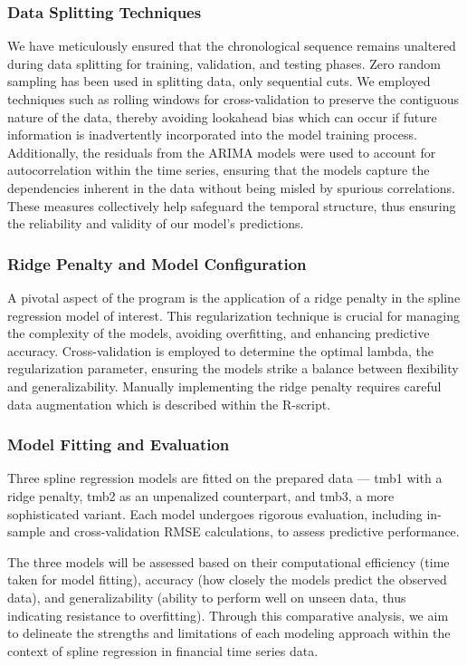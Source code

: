 \documentclass[12pt, twoside,hidelinks]{article}
\theoremstyle{definition}
\numberwithin{equation}{section}
\begin{document}
\subsubsection*{Data Splitting Techniques}
We have meticulously ensured that the chronological sequence remains unaltered during data splitting for training, validation, and testing phases. Zero random sampling has been used in splitting data, only sequential cuts. We employed techniques such as rolling windows for cross-validation to preserve the contiguous nature of the data, thereby avoiding lookahead bias which can occur if future information is inadvertently incorporated into the model training process. Additionally, the residuals from the ARIMA models were used to account for autocorrelation within the time series, ensuring that the models capture the dependencies inherent in the data without being misled by spurious correlations. These measures collectively help safeguard the temporal structure, thus ensuring the reliability and validity of our model's predictions.

\subsubsection*{Ridge Penalty and Model Configuration}
A pivotal aspect of the program is the application of a ridge penalty in the spline regression model of interest. This regularization technique is crucial for managing the complexity of the models, avoiding overfitting, and enhancing predictive accuracy. Cross-validation is employed to determine the optimal lambda, the regularization parameter, ensuring the models strike a balance between flexibility and generalizability. Manually implementing the ridge penalty requires careful data augmentation which is described within the R-script. 

\subsubsection*{Model Fitting and Evaluation}
Three spline regression models are fitted on the prepared data — tmb1 with a ridge penalty, tmb2 as an unpenalized counterpart, and tmb3, a more sophisticated variant. Each model undergoes rigorous evaluation, including in-sample and cross-validation RMSE calculations, to assess predictive performance.
\newline

The three models will be assessed based on their computational efficiency (time taken for model fitting), accuracy (how closely the models predict the observed data), and generalizability (ability to perform well on unseen data, thus indicating resistance to overfitting). Through this comparative analysis, we aim to delineate the strengths and limitations of each modeling approach within the context of spline regression in financial time series data.
\end{document}
